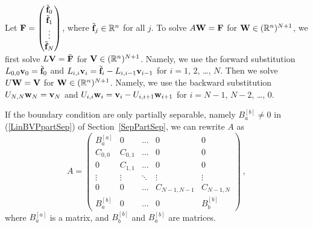 Let $\displaystyle \mathbf{F} = \begin{pmatrix}
\tilde{\mathbf{f}}_0 \\ \tilde{\mathbf{f}}_1 \\ \vdots \\
\tilde{\mathbf{f}}_N \end{pmatrix}$,
where $\tilde{\mathbf{f}}_j \in \mathbb{R}^n$ for all $j$.
To solve $A \mathbf{W} = \mathbf{F}$ for $\mathbf{W} \in (\mathbb{R}^n)^{N+1}$, we first solve
$L\mathbf{V} = \tilde{\mathbf{F}}$ for $\mathbf{V} \in (\mathbb{R}^n)^{N+1}$.  Namely,
we use the forward substitution $L_{0,0}\mathbf{v}_0 = \tilde{\mathbf{f}}_0$ and
$L_{i,i}\mathbf{v}_i = \tilde{\mathbf{f}}_i - L_{i,i-1} \mathbf{v}_{i-1}$ for $i=1$, $2$,
\ldots, $N$.
Then we solve $U \mathbf{W} = \mathbf{V}$ for $\mathbf{W} \in (\mathbb{R}^n)^{N+1}$.
Namely, we use the backward substitution $U_{N,N} \mathbf{w}_N = \mathbf{v}_N$ and
$U_{i,i} \mathbf{w}_i = \mathbf{v}_i - U_{i,i+1} \mathbf{w}_{i+1}$ for $i=N-1$,
$N-2$, \ldots, $0$.

If the boundary condition are only partially separable, namely
$B_a^{[b]} \neq 0$ in (\ref{LinBVPpartSep}) of Section~\ref{SepPartSep},
we can rewrite $A$ as
\begin{equation} \label{part_sepM}
A = \begin{pmatrix}
B_a^{[a]} & 0 & \ldots & 0 & 0 \\
C_{0,0} & C_{0,1} & \ldots & 0 & 0 \\
0 & C_{1,1} & \ldots & 0 & 0 \\
\vdots & \vdots & \ddots & \vdots & \vdots \\
0 & 0 & \ldots & C_{N-1,N-1} & C_{N-1,N} \\
B_a^{[b]} & 0 & \ldots & 0 & B_b^{[b]}
\end{pmatrix} \ ,
\end{equation}
where $B_a^{[a]}$ is a  matrix, and $B_b^{[b]}$ and
$B_a^{[b]}$ are  matrices.

